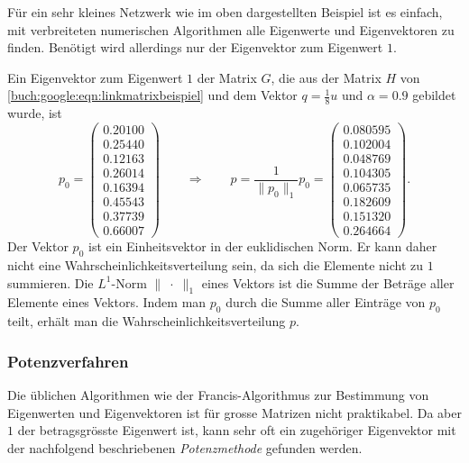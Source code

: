 Für ein sehr kleines Netzwerk wie im oben dargestellten Beispiel ist es
einfach, mit verbreiteten numerischen Algorithmen alle Eigenwerte und
Eigenvektoren zu finden.
Benötigt wird allerdings nur der Eigenvektor zum Eigenwert $1$.

\begin{beispiel}
Ein Eigenvektor zum Eigenwert $1$ der Matrix $G$, die aus der Matrix $H$
von \eqref{buch:google:eqn:linkmatrixbeispiel}
und dem Vektor $q=\frac18u$ und $\alpha=0.9$ gebildet wurde, ist
\[
p_0=\begin{pmatrix}
   0.20100\\
   0.25440\\
   0.12163\\
   0.26014\\
   0.16394\\
   0.45543\\
   0.37739\\
   0.66007
\end{pmatrix}
\qquad\Rightarrow\qquad
p
=
\frac{1}{\|p_0\|_1}p_0
=
\begin{pmatrix}
   0.080595\\
   0.102004\\
   0.048769\\
   0.104305\\
   0.065735\\
   0.182609\\
   0.151320\\
   0.264664
\end{pmatrix}.
\]
Der Vektor $p_0$ ist ein Einheitsvektor in der euklidischen Norm.
Er kann daher nicht eine Wahrscheinlichkeitsverteilung sein,
da sich die Elemente nicht zu $1$ summieren.
Die $L^1$-Norm $\|\;\cdot\;\|_1$ eines Vektors ist die Summe der Beträge aller
Elemente eines Vektors.
Indem man $p_0$ durch die Summe aller Einträge von $p_0$ teilt,
erhält man die Wahrscheinlichkeitsverteilung $p$.
\end{beispiel}


\subsubsection{Potenzverfahren}
Die üblichen Algorithmen wie der Francis-Algorithmus zur Bestimmung
von Eigenwerten und Eigenvektoren ist für grosse Matrizen nicht praktikabel.
Da aber $1$ der betragsgrösste Eigenwert ist, kann sehr oft ein zugehöriger
Eigenvektor mit der nachfolgend beschriebenen {\em Potenzmethode}
gefunden werden.

